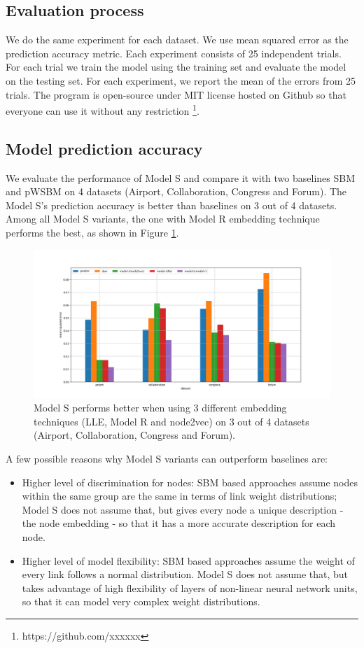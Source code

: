 \documentclass{article} %
\begin{document}
\subsection{Evaluation process}
We do the same experiment for each dataset.
We use mean squared error as the prediction accuracy metric.
Each experiment consists of 25 independent trials.
For each trial we train the model using the training set and evaluate the model on the testing set.
For each experiment, we report the mean of the errors from 25 trials.
The program is open-source under MIT license hosted on Github
so that everyone can use it without any restriction
\footnote{https://github.com/xxxxxx}.

\subsection{Model prediction accuracy}
We evaluate the performance of Model S and compare it with two baselines SBM and pWSBM on 4 datasets (Airport, Collaboration, Congress and Forum).
The Model S's prediction accuracy is better than baselines on 3 out of 4 datasets.
Among all Model S variants,
the one with Model R embedding technique performs the best,
as shown in Figure \ref{fig:errors}.
\begin{figure}[h] \centering
	\includegraphics[width=1\linewidth]{weight-errors}
	\caption{
		Model S performs better when using 3 different embedding techniques (LLE, Model R and node2vec) on 3 out of 4 datasets (Airport, Collaboration, Congress and Forum).
	}
	\label{fig:errors}
\end{figure}
A few possible reasons why Model S variants can outperform baselines are:
\begin{itemize}
	\item Higher level of discrimination for nodes:
	SBM based approaches assume nodes within the same group are the same in terms of link weight distributions;
	Model S does not assume that,
	but gives every node a unique description - the node embedding - so that
	it has a more accurate description for each node.
	\item Higher level of model flexibility:
	SBM based approaches assume the weight of every link follows
	a normal distribution.
	Model S does not assume that, but takes advantage of high flexibility of
	layers of non-linear neural network units,
	so that it can model very complex weight distributions.
\end{itemize}
\end{document}
